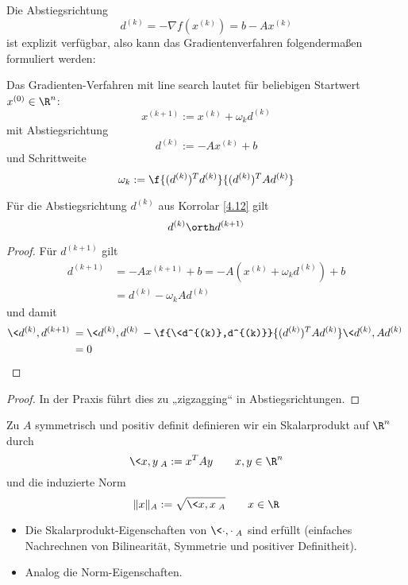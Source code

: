 \documentclass[11pt]{scrartcl}
\begin{document}
Die Abstiegsrichtung
\[
	d^{(k)} = -\nabla f(x^{(k)}) = b - Ax^{(k)}
\]
ist explizit verfügbar, also kann das Gradientenverfahren folgendermaßen formuliert werden:

\begin{kor} \label{4.12}
	Das Gradienten-Verfahren mit line search lautet für beliebigen Startwert $x^{(0)} \in \R^n$:
	\[
		x^{(k+1)} := x^{(k)} + \omega_k d^{(k)}
	\]
	mit Abstiegsrichtung
	\[
		d^{(k)} := -Ax^{(k)} + b
	\]
	und Schrittweite
	\[
		\omega_k := \f {(d^{(k)})^T d^{(k)}}{(d^{(k)})^T A d^{(k)}}
	\]
\end{kor}

\begin{st} \label{4.13}
	Für die Abstiegsrichtung $d^{(k)}$ aus Korrolar \ref{4.12} gilt
	\[
		d^{(k)} \orth d^{(k+1)}
	\]
	\begin{proof}
		Für $d^{(k+1)}$ gilt
		\begin{align*}
			d^{(k+1)} &= -Ax^{(k+1)} + b = -A(x^{(k)} + \omega_k d^{(k)}) + b \\
			&= d^{(k)} - \omega_k A d^{(k)}
		\end{align*}
		und damit
		\begin{align*}
			\< d^{(k)} , d^{(k+1)} \> 
			&= \<d^{(k)}, d^{(k)}\> - \f {\<d^{(k)},d^{(k)}}{(d^{(k)})^TAd^{(k)}} \<d^{(k)}, Ad^{(k)}\> \\
			&= 0
		\end{align*}
	\end{proof}
	\begin{proof}
		In der Praxis führt dies zu „zigzagging“ in Abstiegsrichtungen.
	\end{proof}
\end{st}

\begin{df} \label{4.14}
	Zu $A$ symmetrisch und positiv definit definieren wir ein Skalarprodukt auf $\R^n$ durch
	\[
		\<x, y\>_A := x^T A y
		\qquad x,y \in \R^n
	\]
	und die induzierte Norm
	\[
		\|x\|_A := \sqrt{\<x,x\>_A}
		\qquad x \in \R
	\]
	\begin{note}
		\begin{itemize}
			\item
				Die Skalarprodukt-Eigenschaften von $\<\cdot, \cdot\>_A$ sind erfüllt (einfaches Nachrechnen von Bilinearität, Symmetrie und positiver Definitheit).
			\item
				Analog die Norm-Eigenschaften.
		\end{itemize}
	\end{note}
\end{df}
\end{document}
